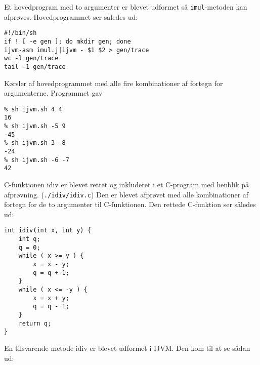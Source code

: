 \documentclass[12pt,a4paper]{article}
\begin{document}
Et hovedprogram med to argumenter er blevet udformet så \texttt{imul}-metoden
kan afprøves. Hovedprogrammet ser således ud:

\lstset{language=sh}
\begin{lstlisting}
#!/bin/sh
if ! [ -e gen ]; do mkdir gen; done
ijvm-asm imul.j|ijvm - $1 $2 > gen/trace
wc -l gen/trace
tail -1 gen/trace
\end{lstlisting}

\clearpage

Kørsler af hovedprogrammet med alle fire kombinationer af fortegn for argumenterne. Programmet gav

\lstset{language=sh}
\begin{lstlisting}
% sh ijvm.sh 4 4
16
% sh ijvm.sh -5 9
-45
% sh ijvm.sh 3 -8
-24
% sh ijvm.sh -6 -7
42
\end{lstlisting}

C-funktionen idiv er blevet rettet og inkluderet i et C-program med henblik på afprøvning. (\texttt{./idiv/idiv.c})
Den er blevet afprøvet med alle kombinationer af fortegn for de to argumenter til C-funktionen.
Den rettede C-funktion ser således ud:

\lstset{language=C}
\begin{lstlisting}
int idiv(int x, int y) { 
	int q;
	q = 0;
	while ( x >= y ) {
		x = x - y;
		q = q + 1;
	}
	while ( x <= -y ) {
		x = x + y;
		q = q - 1;
	}
	return q;
}
\end{lstlisting}

En tilsvarende metode idiv er blevet udformet i IJVM. Den kom til at se sådan ud:

\lstset{language=sh}
\begin{lstlisting}

\end{lstlisting}
\end{document}
